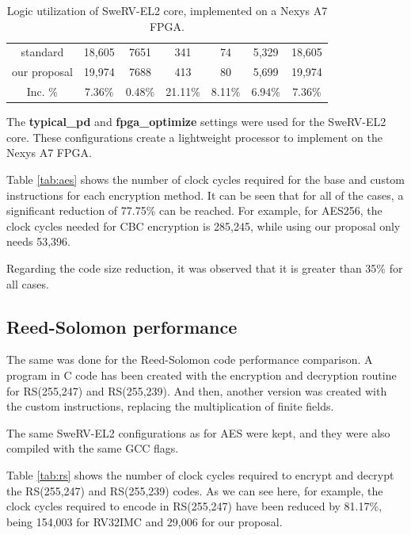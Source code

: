 \begin{table}[tp]
\begin{tabular}{ccccccc}
    \cellcolor[HTML]{EFEFEF}standard     & 18,605                & 7651                 & 341                  & 74                   & 5,329   & 18,605                                   \\
    \cellcolor[HTML]{EFEFEF}our proposal  & 19,974                & 7688                 & 413                  & 80                   & 5,699   & 19,974                                   \\ \hline
    \cellcolor[HTML]{EFEFEF}Inc. \% & 7.36\%                     &    0.48\%                  & 21.11\%                     &  8.11\%                    & 6.94\% & 7.36\%                                           
    \end{tabular}
    \caption{Logic utilization of SweRV-EL2 core, implemented on a Nexys A7 FPGA.}
    \label{tab:area}
\end{table}

The \textbf{typical\_pd} and \textbf{fpga\_optimize} settings were used for the SweRV-EL2 core. These configurations create a lightweight processor to implement on the Nexys A7 FPGA.

Table \ref{tab:aes} shows the number of clock cycles required for the base and custom instructions for each encryption method. It can be seen that for all of the cases, a significant reduction of 77.75\% can be reached. 
For example, for AES256, the clock cycles needed for CBC encryption is 285,245, while using our proposal only needs 53,396.

Regarding the code size reduction, it was observed that it is greater than 35\% for all cases.

\subsection{Reed-Solomon performance} 

The same was done for the Reed-Solomon code performance comparison. A program in C code has been created with the encryption and decryption routine for RS(255,247) and RS(255,239). And then, another 
version was created with the custom instructions, replacing the multiplication of finite fields.

The same SweRV-EL2 configurations as for AES were kept, and they were also compiled with the same GCC flags.

Table \ref{tab:rs} shows the number of clock cycles required to encrypt and decrypt the RS(255,247) and RS(255,239) codes. 
As we can see here, for example, the clock cycles required to encode in RS(255,247) have been reduced by 81.17\%, 
being 154,003 for RV32IMC and 29,006 for our proposal.

